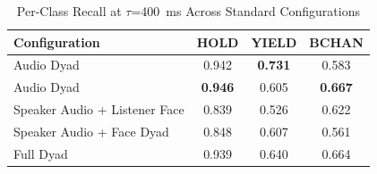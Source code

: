 \begin{table}[h]
\caption{Per-Class Recall at $\tau$=400~ms Across Standard Configurations}
\label{tab:recall_per_class_standard}
\small
\renewcommand{\arraystretch}{1.20}
\begin{tabular}{>{\raggedright\arraybackslash}p{4cm}ccc}
\toprule
Configuration & HOLD & YIELD & BCHAN \\
\midrule
Audio Dyad & 0.942 & \textbf{0.731} & 0.583 \\
Audio Dyad & \textbf{0.946} & 0.605 & \textbf{0.667} \\
Speaker Audio + Listener Face & 0.839 & 0.526 & 0.622 \\
Speaker Audio + Face Dyad & 0.848 & 0.607 & 0.561 \\
Full Dyad & 0.939 & 0.640 & 0.664 \\
\bottomrule
\end{tabular}
\end{table}
